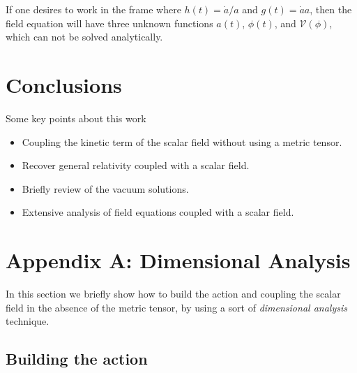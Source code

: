 \documentclass[10pt,a4paper]{article}
\begin{document}
If one desires to work in the frame where $h(t) = \dot{a}/a$ and $g(t) = \dot{a}a$, then the field equation will have three unknown
functions $a(t)$, $\phi(t)$, and $\mathcal{V}(\phi)$, which can not be solved analytically.

\section{Conclusions}

Some key points about this work

\begin{itemize}
  \item Coupling the kinetic term of the scalar field without using a metric tensor.
  \item Recover general relativity coupled with a scalar field.
  \item Briefly review of the vacuum solutions.
  \item Extensive analysis of field equations coupled with a scalar field.
\end{itemize}





\section{Appendix A: Dimensional Analysis}

In this section we briefly show how to build the action and coupling the scalar field in the absence of the metric tensor, by using a sort of
\textit{dimensional analysis} technique.

\subsection{Building the action}
\end{document}
